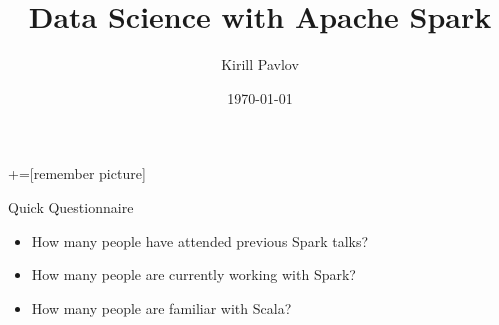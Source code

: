 \documentclass[unicode, notheorems]{beamer}
\title{Data Science with Apache Spark}
\author{Kirill Pavlov}
\institute[]{Data Science Team, Asia Miles Limited}
\date{\today}
\begin{document}
+=[remember picture]

\everymath{\displaystyle}


\begin{frame}
\titlepage
\end{frame}

\begin{frame}{Quick Questionnaire}
\begin{itemize}
\item How many people have attended previous Spark talks? \pause
\item How many people are currently working with Spark? \pause
\item How many people are familiar with Scala?
\end{itemize}
\end{frame}
\end{document}
